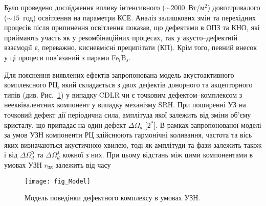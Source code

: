 Було проведено дослідження впливу інтенсивного ($\sim2000$~Вт/м$^2$) довготривалого ($\sim15$~год) освітлення на параметри КСЕ.
Аналіз залишкових змін та перехідних процесів після припинення освітлення показав, що дефектами в ОПЗ та КНО, які приймають участь як у рекомбінаційних процесах, так у акусто--дефектнiй взаємодiї є, переважно, кисневмiснi преципiтати (КП).
Крім того, певний внесок у ці процеси пов'язаний з парами Fe$_i$B$_s$.

Для пояснення виявлених ефектів запропонована модель акустоактивного комплексного РЦ, який складається
з двох дефектів донорного та акцепторного типів (див. Рис.~\ref{fig_Model}) у випадку CDLR  чи є точковим дефектом--комплексом з нееквівалентних компонент у випадку механізму SRH.
При поширенні УЗ на точковий дефект дії періодична сила, амплітуда якої залежить від зміни об'єму кристалу, що припадає на один дефект $\Delta\Omega_d$
[2$^*$].
В рамках запропонованої моделі за умов УЗН компоненти РЦ здійснюють гармонічні коливання, частота та вісь яких визначаються акустичною хвилею, тоді як амплітуди та фази залежить також і від  $\Delta\Omega_d^\mathtt{D}$ та
$\Delta\Omega_d^\mathtt{A}$ кожної з них.
При цьому відстань між цими компонентами в умовах УЗН $r_\mathtt{US}$ залежить від часу

\begin{figure}[ht]
\center
\texttt{[image: fig\_Model]}
\caption{\label{fig_Model}
Модель поведінки дефектного комплексу в умовах УЗН.
}%
\end{figure}

